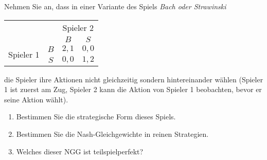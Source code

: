 Nehmen Sie an, dass in einer Variante des Spiels \emph{Bach oder Strawinski}
\begin{center}
  \begin{tabular}{cccc}
    & & \multicolumn{2}{c}{Spieler 2}\\
    & & $B$ & $S$\\
    \cmidrule{3-4}
    \multirow{2}{*}{Spieler 1}
    & $B$ & $2,1$ & $0,0$\\
    \cmidrule{3-4}
    & $S$ & $0,0$ & $1,2$\\
    \cmidrule{3-4}
  \end{tabular}
\end{center}
die Spieler ihre Aktionen nicht gleichzeitig sondern hintereinander wählen (Spieler 1 ist
zuerst am Zug, Spieler 2 kann die Aktion von Spieler 1 beobachten, bevor er seine Aktion
wählt).
\begin{enumerate}
  \item Bestimmen Sie die strategische Form dieses Spiels.
  \item Bestimmen Sie die Nash-Gleichgewichte in reinen Strategien.
  \item Welches dieser NGG ist teilspielperfekt?
\end{enumerate}


